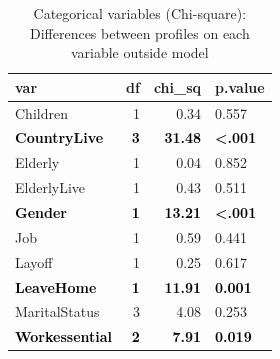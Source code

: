 \documentclass[]{article}
\begin{document}
\begin{table}[H]

\caption{\label{tab:unnamed-chunk-11}Categorical variables (Chi-square): Differences between profiles on each variable outside model}
\centering
\fontsize{6}{8}\selectfont
\begin{tabular}[t]{lrrl}
\toprule
var & df & chi\_sq & p.value\\
\midrule
Children & 1 & 0.34 & 0.557\\
\textcolor{black}{\textbf{CountryLive}} & \textcolor{black}{\textbf{3}} & \textcolor{black}{\textbf{31.48}} & \textcolor{black}{\textbf{<.001}}\\
Elderly & 1 & 0.04 & 0.852\\
ElderlyLive & 1 & 0.43 & 0.511\\
\textcolor{black}{\textbf{Gender}} & \textcolor{black}{\textbf{1}} & \textcolor{black}{\textbf{13.21}} & \textcolor{black}{\textbf{<.001}}\\
\addlinespace
Job & 1 & 0.59 & 0.441\\
Layoff & 1 & 0.25 & 0.617\\
\textcolor{black}{\textbf{LeaveHome}} & \textcolor{black}{\textbf{1}} & \textcolor{black}{\textbf{11.91}} & \textcolor{black}{\textbf{0.001}}\\
MaritalStatus & 3 & 4.08 & 0.253\\
\textcolor{black}{\textbf{Workessential}} & \textcolor{black}{\textbf{2}} & \textcolor{black}{\textbf{7.91}} & \textcolor{black}{\textbf{0.019}}\\
\bottomrule
\end{tabular}
\end{table}
\end{document}
